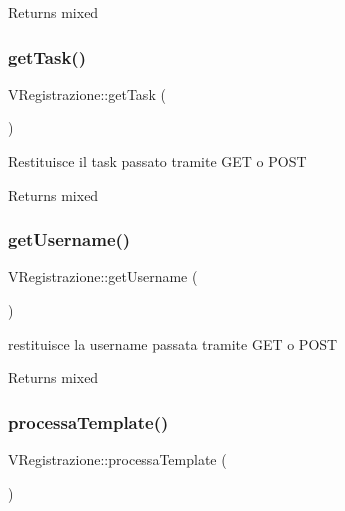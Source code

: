\begin{DoxyReturn}{Returns}
mixed 
\end{DoxyReturn}
\mbox{\label{class_v_registrazione_ac02dfc8636611a3b90644cfabe25cbef}} 
\subsubsection{\texorpdfstring{get\+Task()}{getTask()}}
{\footnotesize\ttfamily V\+Registrazione\+::get\+Task (\begin{DoxyParamCaption}{ }\end{DoxyParamCaption})}

Restituisce il task passato tramite G\+ET o P\+O\+ST

\begin{DoxyReturn}{Returns}
mixed 
\end{DoxyReturn}
\mbox{\label{class_v_registrazione_a4aefbbdc87649de9c8ae8c8f9d70310a}} 
\subsubsection{\texorpdfstring{get\+Username()}{getUsername()}}
{\footnotesize\ttfamily V\+Registrazione\+::get\+Username (\begin{DoxyParamCaption}{ }\end{DoxyParamCaption})}

restituisce la username passata tramite G\+ET o P\+O\+ST

\begin{DoxyReturn}{Returns}
mixed 
\end{DoxyReturn}
\mbox{\label{class_v_registrazione_af24b75acb63fb916d4e3d7b586aa70f5}} 
\subsubsection{\texorpdfstring{processa\+Template()}{processaTemplate()}}
{\footnotesize\ttfamily V\+Registrazione\+::processa\+Template (\begin{DoxyParamCaption}{ }\end{DoxyParamCaption})}

